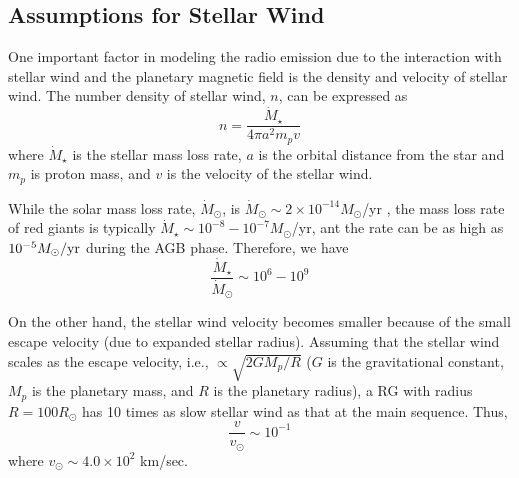 \documentclass{emulateapj}
\def\memoYF#1{\color{red}$[${\bf #1}$]$ \color{black}}
\begin{document}
\subsection{Assumptions for Stellar Wind}
\label{ss:stellarwind}

One important factor in modeling the radio emission due to the interaction with stellar wind and the planetary magnetic field is the density and velocity of stellar wind. 
The number density of stellar wind, $n$, can be expressed as
\begin{equation}
n = \frac{\dot M_\star}{4\pi a^2 m_p v}
\label{eq:n}
\end{equation}
where $\dot M_\star$ is the stellar mass loss rate, $a$ is the orbital distance from the star and $m_p$ is proton mass, and $v$ is the velocity of the stellar wind. 

While the solar mass loss rate, $\dot M_\odot$, is $\dot M_\odot \sim 2\times 10^{-14} M_{\odot}$/yr \citep[e.g.,][]{hundhausen1997}, the mass loss rate of red giants is typically $\dot M_\star \sim 10^{-8}-10^{-7} M_{\odot}$/yr, ant the rate can be as high as $10^{-5} M_\odot{\rm /yr}$ during the AGB phase. 
Therefore, we have
\begin{equation}
\frac{\dot M_\star}{\dot M_{\odot}} \sim 10^6 - 10^9
\end{equation}

On the other hand, the stellar wind velocity becomes smaller because of the small escape velocity (due to expanded stellar radius).
Assuming that the stellar wind scales as the escape velocity, i.e., $\propto \sqrt{2GM_p/R}$ ($G$ is the gravitational constant, $M_p$ is the planetary mass, and $R$ is the planetary radius), a RG with radius $R=100R_{\odot}$ has 10 times as slow stellar wind as that at the main sequence. 
Thus, 
\begin{equation}
\frac{v}{v_{\odot}} \sim 10^{-1}
\end{equation}
where $v_{\odot} \sim 4.0 \times 10^2 $ km/sec. 

\end{document}
